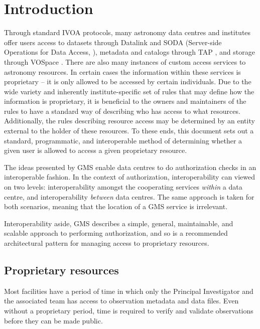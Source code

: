 \documentclass[11pt,a4paper]{ivoa}
\begin{document}
\section{Introduction}

Through standard IVOA protocols, many astronomy data centres and institutes offer users access to datasets through Datalink \citep{2015ivoa.spec.0617D} and SODA (Server-side Operations for Data Access, \citet{2017ivoa.spec.0517B}), metadata and catalogs through TAP \citep{2010ivoa.spec.0327D}, and storage through VOSpace \citep{2018ivoa.spec.0621G}.  There are also many instances of custom access services to astronomy resources.  In certain cases the information within these services is proprietary -- it is only allowed to be accessed by certain individuals.  Due to the wide variety and inherently institute-specific set of rules that may define how the information is proprietary, it is beneficial to the owners and maintainers of the rules to have a standard way of describing who has access to what resources.  Additionally, the rules describing resource access may be determined by an entity external to the holder of these resources.  To these ends, this document sets out a standard, programmatic, and interoperable method of determining whether a given user is allowed to access a given proprietary resource.

The ideas presented by GMS enable data centres to do authorization checks in an interoperable fashion.  In the context of authorization, interoperability can viewed on two levels:  interoperability amongst the cooperating services \emph{within} a data centre, and interoperability \emph{between} data centres.  The same approach is taken for both scenarios, meaning that the location of a GMS service is irrelevant. 

Interoperability aside, GMS describes a simple, general, maintainable, and scalable approach to performing authorization, and so is a recommended architectural pattern for managing access to proprietary resources.

\subsection{Proprietary resources}
\label{subsec:propresources}

Most facilities have a period of time in which only the Principal Investigator and the associated team has access to observation metadata and data files.  Even without a proprietary period, time is required to verify and validate observations before they can be made public.
\end{document}
